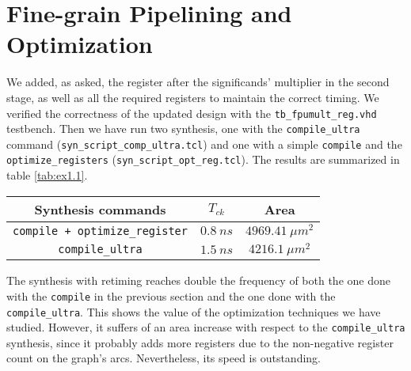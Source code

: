 \section{Fine-grain Pipelining and Optimization}

We added, as asked, the register after the significands' multiplier in the second stage, as well as all the required registers
to maintain the correct timing. We verified the correctness of the updated design with the \verb|tb_fpumult_reg.vhd| testbench.
Then we have run two synthesis, one with the \verb|compile_ultra| command (\verb|syn_script_comp_ultra.tcl|) and one with a simple
\verb|compile| and the \verb|optimize_registers| (\verb|syn_script_opt_reg.tcl|). The results are summarized in table \ref{tab:ex1.1}.

\begin{center}
    \label{tab:ex1.1}
    \begin{tabular}{ |c|c|c| }
        \hline
        Synthesis commands & $T_{ck}$ & Area \\
        \hline
        \verb|compile + optimize_register| & $0.8\ ns$ & $4969.41\ \mu m^2$ \\
        \hline
        \verb|compile_ultra| & $1.5\ ns$ & $4216.1\ \mu m^2$ \\
        \hline
    \end{tabular}
\end{center}

The synthesis with retiming reaches double the frequency of both the one done with the \verb|compile| in the previous section and the one
done with the \verb|compile_ultra|. This shows the value of the optimization techniques we have studied. However, it suffers of an area
increase with respect to the \verb|compile_ultra| synthesis, since it probably adds more registers due to the non-negative register count
on the graph's arcs. Nevertheless, its speed is outstanding.